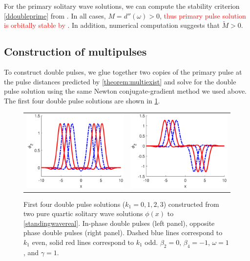 \documentclass[12pt]{elsarticle}
\newcommand{\revised}[1]{ \textcolor{red}{#1} }
\begin{document}
For the primary solitary wave solutions, we can compute the stability criterion \cref{ddoubleprime} from \cite{Grillakis1987}. In all cases, $M = d''(\omega) > 0$, \revised{thus primary pulse solution is orbitally stable by \cite[Theorem 3.5]{Grillakis1987}}. In addition, numerical computation suggests that $\tilde{M} > 0$.

\subsection{Construction of multipulses}

To construct double pulses, we glue together two copies of the primary pulse at the pulse distances predicted by \cref{theorem:multiexist} and solve for the double pulse solution using the same Newton conjugate-gradient method we used above. The first four double pulse solutions are shown in \cref{fig:doublepulses}. 
\begin{figure}[H]
\centering
\begin{tabular}{cc}
\includegraphics[width=8cm]{images/DPplus.eps} &
\includegraphics[width=8cm]{images/DPminus.eps}
\end{tabular}
\caption{First four double pulse solutions ($k_1 = 0, 1, 2, 3$) constructed from two pure quartic solitary wave solutions $\phi(x)$ to \cref{standingwavereal}. In-phase double pulses (left panel), opposite phase double pulses (right panel). Dashed blue lines correspond to $k_1$ even, solid red lines correspond to $k_1$ odd. $\beta_2 = 0$, $\beta_4 = -1$, $\omega = 1$, and $\gamma = 1$. }
\label{fig:doublepulses}
\end{figure} 
\end{document}
